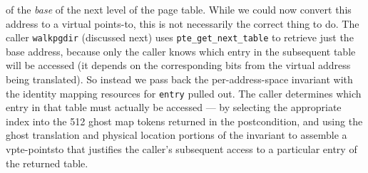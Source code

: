 of the \emph{base} of the next level of the page table.
While we could now convert this address to a virtual points-to, this is not necessarily the correct thing to do.
The caller \lstinline|walkpgdir| (discussed next) uses \lstinline|pte_get_next_table| to retrieve just the base address,
because only the caller knows which entry in the subsequent table will be accessed (it depends on the corresponding bits from the virtual
address being translated). So instead we pass back the per-address-space invariant with the identity mapping resources for \lstinline|entry|
pulled out. The caller determines which entry in that table must actually
be accessed --- by selecting the appropriate index into the 512 ghost map tokens returned in the postcondition,
and using the ghost translation and physical location portions of the invariant to assemble a vpte-pointsto
that justifies the caller's subsequent access to a particular entry of the returned table.

